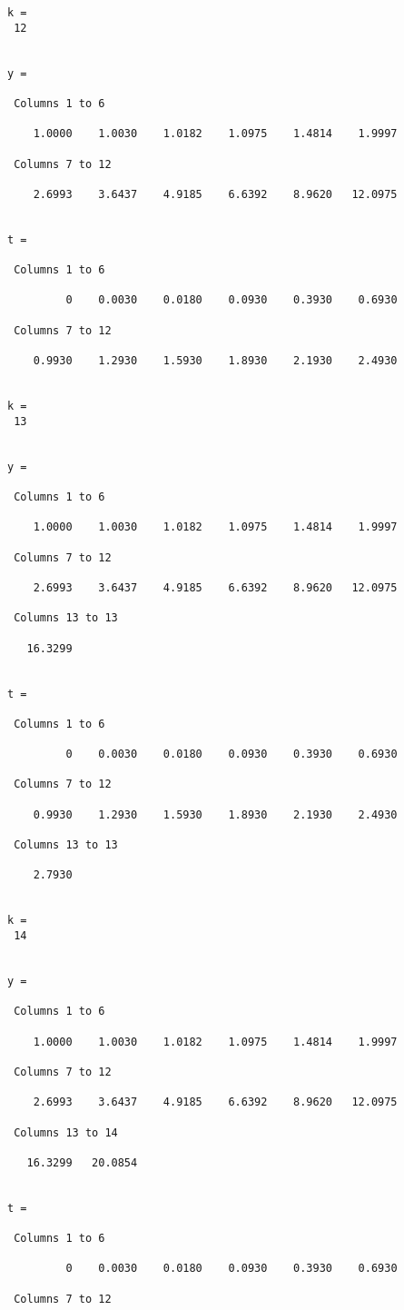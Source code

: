 \begin{verbatim}
k = 
 12 


y = 

 Columns 1 to 6

    1.0000    1.0030    1.0182    1.0975    1.4814    1.9997 

 Columns 7 to 12

    2.6993    3.6437    4.9185    6.6392    8.9620   12.0975 


t = 

 Columns 1 to 6

         0    0.0030    0.0180    0.0930    0.3930    0.6930 

 Columns 7 to 12

    0.9930    1.2930    1.5930    1.8930    2.1930    2.4930 


k = 
 13 


y = 

 Columns 1 to 6

    1.0000    1.0030    1.0182    1.0975    1.4814    1.9997 

 Columns 7 to 12

    2.6993    3.6437    4.9185    6.6392    8.9620   12.0975 

 Columns 13 to 13

   16.3299 


t = 

 Columns 1 to 6

         0    0.0030    0.0180    0.0930    0.3930    0.6930 

 Columns 7 to 12

    0.9930    1.2930    1.5930    1.8930    2.1930    2.4930 

 Columns 13 to 13

    2.7930 


k = 
 14 


y = 

 Columns 1 to 6

    1.0000    1.0030    1.0182    1.0975    1.4814    1.9997 

 Columns 7 to 12

    2.6993    3.6437    4.9185    6.6392    8.9620   12.0975 

 Columns 13 to 14

   16.3299   20.0854 


t = 

 Columns 1 to 6

         0    0.0030    0.0180    0.0930    0.3930    0.6930 

 Columns 7 to 12


\end{verbatim}
